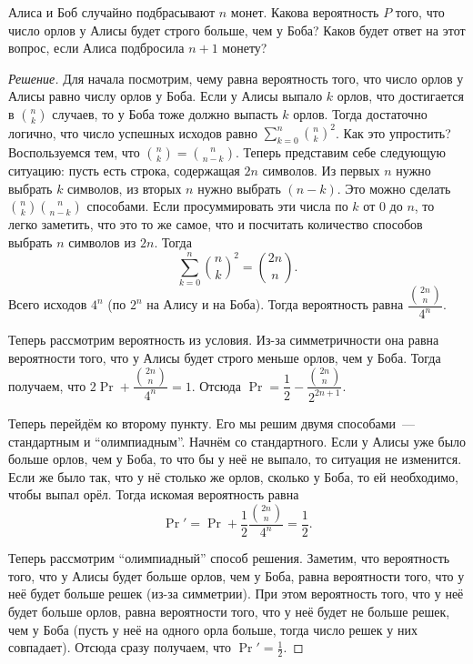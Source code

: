 \begin{problem}
    Алиса и Боб случайно подбрасывают \(n\) монет. Какова вероятность \(P\) того, что число орлов у Алисы будет строго больше, чем у Боба? Каков будет ответ на этот вопрос, если Алиса подбросила \(n + 1\) монету?
\end{problem}
\begin{proof}[Решение]
    Для начала посмотрим, чему равна вероятность того, что число орлов у Алисы равно числу орлов у Боба.
    Если у Алисы выпало \(k\) орлов, что достигается в \(\binom{n}{k}\) случаев, то у Боба тоже должно выпасть \(k\) орлов. Тогда достаточно логично, что число успешных исходов равно \(\sum\limits_{k = 0}^{n} \binom{n}{k}^2\). Как это упростить? Воспользуемся тем, что \(\binom{n}{k} = \binom{n}{n - k}\). Теперь представим себе следующую ситуацию: пусть есть строка, содержащая \(2n\) символов. Из первых \(n\) нужно выбрать \(k\) символов, из вторых \(n\) нужно выбрать \((n - k)\). Это можно сделать \(\binom{n}{k}\binom{n}{n - k}\) способами. Если просуммировать эти числа по \(k\) от 0 до \(n\), то легко заметить, что это то же самое, что и посчитать количество способов выбрать \(n\) символов из \(2n\). Тогда \[\sum\limits_{k = 0}^{n} \binom{n}{k}^2 = \binom{2n}{n}.\]
    Всего исходов \(4^n\) (по \(2^n\) на Алису и на Боба). Тогда вероятность равна \(\dfrac{\binom{2n}{n}}{4^n}\).
    
    Теперь рассмотрим вероятность из условия. Из-за симметричности она равна вероятности того, что у Алисы будет строго меньше орлов, чем у Боба. Тогда получаем, что \(2\Pr + \dfrac{\binom{2n}{n}}{4^n} = 1\). Отсюда \(\Pr = \dfrac{1}{2} - \dfrac{\binom{2n}{n}}{2^{2n + 1}}\).
    
    Теперь перейдём ко второму пункту. Его мы решим двумя способами~--- стандартным и ``олимпиадным''. Начнём со стандартного. Если у Алисы уже было больше орлов, чем у Боба, то что бы у неё не выпало, то ситуация не изменится. Если же было так, что у нё столько же орлов, сколько у Боба, то ей необходимо, чтобы выпал орёл. Тогда искомая вероятность равна \[\Pr' = \Pr + \dfrac{1}{2}\dfrac{\binom{2n}{n}}{4^n} = \dfrac{1}{2}.\]
    
    Теперь рассмотрим ``олимпиадный'' способ решения. Заметим, что вероятность того, что у Алисы будет больше орлов, чем у Боба, равна вероятности того, что у неё будет больше решек (из-за симметрии). При этом вероятность того, что у неё будет больше орлов, равна вероятности того, что у неё будет не больше решек, чем у Боба (пусть у неё на одного орла больше, тогда число решек у них совпадает). Отсюда сразу получаем, что \(\Pr' = \frac{1}{2}.\)
\end{proof}

